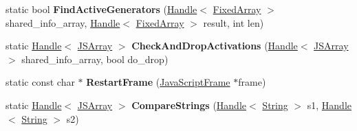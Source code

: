 \begin{DoxyCompactItemize}
\item 
\hypertarget{classv8_1_1internal_1_1_live_edit_a2a7883bd24f0af7910bdc3af66af6c01}{}static bool {\bfseries Find\+Active\+Generators} (\hyperlink{classv8_1_1internal_1_1_handle}{Handle}$<$ \hyperlink{classv8_1_1internal_1_1_fixed_array}{Fixed\+Array} $>$ shared\+\_\+info\+\_\+array, \hyperlink{classv8_1_1internal_1_1_handle}{Handle}$<$ \hyperlink{classv8_1_1internal_1_1_fixed_array}{Fixed\+Array} $>$ result, int len)\label{classv8_1_1internal_1_1_live_edit_a2a7883bd24f0af7910bdc3af66af6c01}

\item 
\hypertarget{classv8_1_1internal_1_1_live_edit_a4c066c9e553d34b2413d750ac6d6b2bb}{}static \hyperlink{classv8_1_1internal_1_1_handle}{Handle}$<$ \hyperlink{classv8_1_1internal_1_1_j_s_array}{J\+S\+Array} $>$ {\bfseries Check\+And\+Drop\+Activations} (\hyperlink{classv8_1_1internal_1_1_handle}{Handle}$<$ \hyperlink{classv8_1_1internal_1_1_j_s_array}{J\+S\+Array} $>$ shared\+\_\+info\+\_\+array, bool do\+\_\+drop)\label{classv8_1_1internal_1_1_live_edit_a4c066c9e553d34b2413d750ac6d6b2bb}

\item 
\hypertarget{classv8_1_1internal_1_1_live_edit_a1bad0f05b0b31ac1c4dcf36ee2052f7a}{}static const char $\ast$ {\bfseries Restart\+Frame} (\hyperlink{classv8_1_1internal_1_1_java_script_frame}{Java\+Script\+Frame} $\ast$frame)\label{classv8_1_1internal_1_1_live_edit_a1bad0f05b0b31ac1c4dcf36ee2052f7a}

\item 
\hypertarget{classv8_1_1internal_1_1_live_edit_acd0da5b9c5a98a4029ac4a36b2a566b8}{}static \hyperlink{classv8_1_1internal_1_1_handle}{Handle}$<$ \hyperlink{classv8_1_1internal_1_1_j_s_array}{J\+S\+Array} $>$ {\bfseries Compare\+Strings} (\hyperlink{classv8_1_1internal_1_1_handle}{Handle}$<$ \hyperlink{classv8_1_1internal_1_1_string}{String} $>$ s1, \hyperlink{classv8_1_1internal_1_1_handle}{Handle}$<$ \hyperlink{classv8_1_1internal_1_1_string}{String} $>$ s2)\label{classv8_1_1internal_1_1_live_edit_acd0da5b9c5a98a4029ac4a36b2a566b8}

\end{DoxyCompactItemize}
